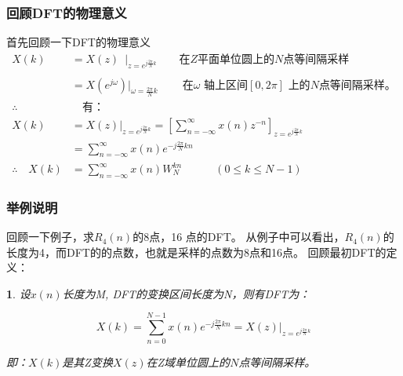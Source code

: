 \documentclass[notheorems,compress,mathserif,table]{beamer}
\newtheorem{dablock}{}
\begin{document}
\begin{frame}[shrink]\frametitle{回顾DFT的物理意义}%

首先回顾一下DFT的物理意义
\begin{equation*}
\begin{split}
X(k)  &= X(z)\;\:\Big|_{z = e^{j\frac{2\pi}{N}k}}  \qquad \mbox{在$Z$平面单位圆上的$N$点等间隔采样}\\
 \quad&\quad\\
      &= X(e^{j\omega})\Big|_{\omega = \frac{2\pi}{N}k} \qquad\: \mbox{在$\omega$ 轴上区间$[0,2\pi]$ 上的$N$点等间隔采样。}\\
\therefore\quad  &\quad\mbox{有：}   \\
X(k) &= X(z)\Big|_{z = e^{j\frac{2\pi}{N}k}} = \left[\sum_{n=-\infty}^{\infty}x(n)z^{-n}\right]_{z = e^{j\frac{2\pi}{N}k}}\\
     &= \sum_{n=-\infty}^{\infty}x(n)e^{-j\frac{2\pi}{N}kn} \\
\therefore\quad X(k) &= \sum_{n=-\infty}^{\infty}x(n)W_N^{kn} \qquad\quad (0 \leq k \leq N-1)
\end{split}
\end{equation*}
\end{frame}




\begin{frame}[shrink]\frametitle{举例说明}%
回顾一下例子，求$R_4(n)$的8点，16 点的DFT。
\newline\newline
从例子中可以看出，$R_4(n)$的长度为4，而DFT的的点数，也就是采样的点数为8点和16点。
\newline\newline
回顾最初DFT的定义：
\begin{dablock}
	设$ x(n) $长度为M, DFT的变换区间长度为N，则有DFT为：
	
	$$ X(k) = \sum_{n=0}^{N-1}x(n)e^{-j\frac{2\pi}{N}kn} = X(z)\Big|_{z = e^{j\frac{2\pi}{N}k}}$$
	

即：$X(k)$是其Z变换$X(z)$在Z域单位圆上的$N$点等间隔采样。
\end{dablock}
\end{frame}
\end{document}
